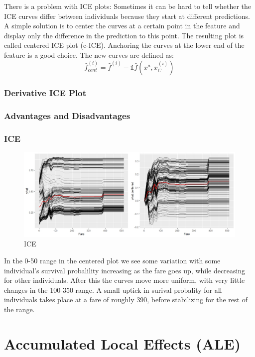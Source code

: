 \documentclass[]{krantz}
\begin{document}
There is a problem with ICE plots: Sometimes it can be hard to tell
whether the ICE curves differ between individuals because they start at
different predictions. A simple solution is to center the curves at a
certain point in the feature and display only the difference in the
prediction to this point. The resulting plot is called centered ICE plot
(c-ICE). Anchoring the curves at the lower end of the feature is a good
choice. The new curves are defined as:
\[\hat{f}^{(i)}_{cent} = \hat{f}^{(i)} - \mathbb{1}\hat{f}(x^a,x^{(i)}_C)\]

\subsection{Derivative ICE Plot}\label{derivative-ice-plot}

\subsection{Advantages and
Disadvantages}\label{advantages-and-disadvantages}

\subsection{ICE}\label{ice}

\begin{figure}
\centering
\includegraphics{ice_plots.jpeg}
\caption{ICE}
\end{figure}

In the 0-50 range in the centered plot we see some variation with some
individual's survival probalility increasing as the fare goes up, while
decreasing for other individuals. After this the curves move more
uniform, with very little changes in the 100-350 range. A small uptick
in surival probality for all individuals takes place at a fare of
roughly 390, before stabilizing for the rest of the range.

\chapter{Accumulated Local Effects
(ALE)}\label{accumulated-local-effects-ale}
\end{document}
